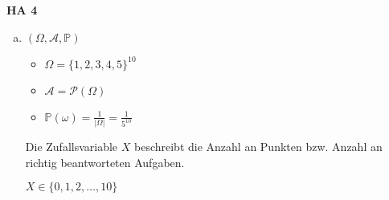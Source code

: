 \documentclass[a4paper,12pt]{article}
\newcommand{\Aufgabe}[1]{
        {
        \vspace*{0.5cm}
        \textbf{HA #1}
        \vspace*{0.2cm}
    }
}
\begin{document}
    \Aufgabe{4}
    \begin{enumerate}[(a)]
        \item 

        $ (\Omega, \mathcal{A}, \mathbb{P}) $

        \begin{itemize}
            \item $ \Omega = \{1, 2, 3, 4, 5\}^10 $
            \item $ \mathcal{A} = \mathcal{P}(\Omega) $
            \item $ \displaystyle \mathbb{P}(\omega) = \frac{1}{|\Omega|} = \frac{1}{5^{10}} $
        \end{itemize}

        Die Zufallsvariable $ X $ beschreibt die Anzahl an Punkten bzw. Anzahl an richtig beantworteten Aufgaben.
        
        $ X \in \{0, 1, 2, \dots, 10\} $

    \end{enumerate}
\end{document}
